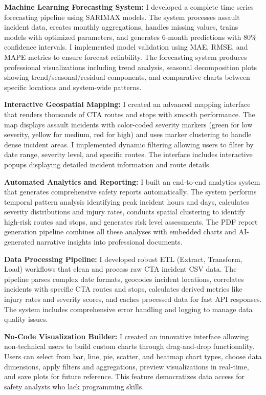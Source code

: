 \documentclass[12pt,letterpaper]{article}
\begin{document}
\textbf{Machine Learning Forecasting System:} I developed a complete time series forecasting pipeline using SARIMAX models. The system processes assault incident data, creates monthly aggregations, handles missing values, trains models with optimized parameters, and generates 6-month predictions with 80\% confidence intervals. I implemented model validation using MAE, RMSE, and MAPE metrics to ensure forecast reliability. The forecasting system produces professional visualizations including trend analysis, seasonal decomposition plots showing trend/seasonal/residual components, and comparative charts between specific locations and system-wide patterns.

\textbf{Interactive Geospatial Mapping:} I created an advanced mapping interface that renders thousands of CTA routes and stops with smooth performance. The map displays assault incidents with color-coded severity markers (green for low severity, yellow for medium, red for high) and uses marker clustering to handle dense incident areas. I implemented dynamic filtering allowing users to filter by date range, severity level, and specific routes. The interface includes interactive popups displaying detailed incident information and route details.

\textbf{Automated Analytics and Reporting:} I built an end-to-end analytics system that generates comprehensive safety reports automatically. The system performs temporal pattern analysis identifying peak incident hours and days, calculates severity distributions and injury rates, conducts spatial clustering to identify high-risk routes and stops, and generates risk level assessments. The PDF report generation pipeline combines all these analyses with embedded charts and AI-generated narrative insights into professional documents.

\textbf{Data Processing Pipeline:} I developed robust ETL (Extract, Transform, Load) workflows that clean and process raw CTA incident CSV data. The pipeline parses complex date formats, geocodes incident locations, correlates incidents with specific CTA routes and stops, calculates derived metrics like injury rates and severity scores, and caches processed data for fast API responses. The system includes comprehensive error handling and logging to manage data quality issues.

\textbf{No-Code Visualization Builder:} I created an innovative interface allowing non-technical users to build custom charts through drag-and-drop functionality. Users can select from bar, line, pie, scatter, and heatmap chart types, choose data dimensions, apply filters and aggregations, preview visualizations in real-time, and save plots for future reference. This feature democratizes data access for safety analysts who lack programming skills.
\end{document}
